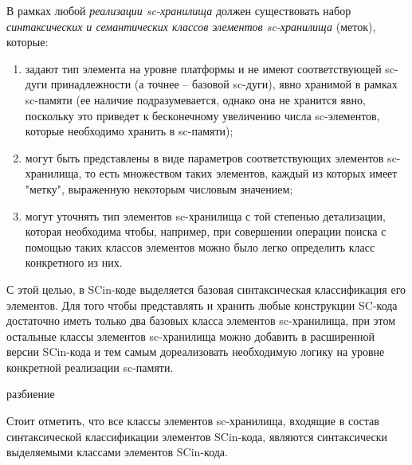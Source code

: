 В рамках любой \textit{реализации sc-хранилища} должен существовать набор \textit{синтаксических и семантических классов элементов sc-хранилища} (меток), которые:
\begin{enumerate}
    \item задают тип элемента на уровне платформы и не имеют соответствующей sc-дуги принадлежности (а точнее -- базовой sc-дуги), явно хранимой в рамках sc-памяти (ее наличие подразумевается, однако она не хранится явно, поскольку это приведет к бесконечному увеличению числа sc-элементов, которые необходимо хранить в sc-памяти);
    \item могут быть представлены в виде параметров соответствующих элементов sc-хранилища, то есть множеством таких элементов, каждый из которых имеет "метку", выраженную некоторым числовым значением;
    \item могут уточнять тип элементов sc-хранилища с той степенью детализации, которая необходима чтобы, например, при совершении операции поиска с помощью таких классов элементов можно было легко определить класс конкретного из них.
\end{enumerate}

С этой целью, в SCin-коде выделяется базовая синтаксическая классификация его элементов. Для того чтобы представлять и хранить любые конструкции SC-кода достаточно иметь только два базовых класса элементов sc-хранилища, при этом остальные классы элементов sc-хранилища можно добавить в расширенной версии SCin-кода и тем самым дореализовать необходимую логику на уровне конкретной реализации sc-памяти.

\begin{SCn}
\begin{scnsubstruct}

\begin{scnrelfromset}{разбиение}
\end{scnrelfromset}

\end{scnsubstruct}
\end{SCn}

Стоит отметить, что все классы элементов sc-хранилища, входящие в состав синтаксической классификации элементов SCin-кода, являются синтаксически выделяемыми классами элементов SCin-кода.

